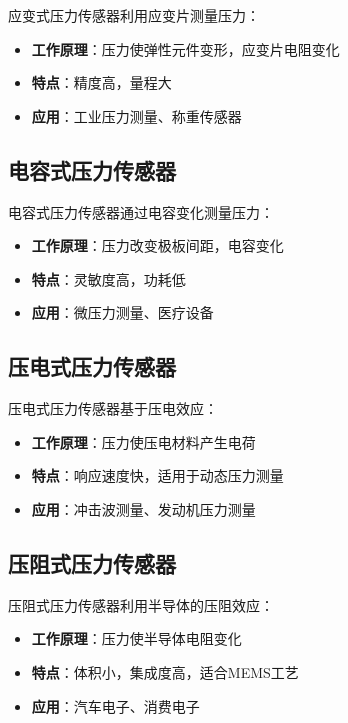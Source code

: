 \documentclass[12pt,UTF8]{ctexbook}
\begin{document}
应变式压力传感器利用应变片测量压力：

\begin{itemize}[leftmargin=2cm]
	\item \textbf{工作原理}：压力使弹性元件变形，应变片电阻变化
	\item \textbf{特点}：精度高，量程大
	\item \textbf{应用}：工业压力测量、称重传感器
\end{itemize}

\subsection{电容式压力传感器}

电容式压力传感器通过电容变化测量压力：

\begin{itemize}[leftmargin=2cm]
	\item \textbf{工作原理}：压力改变极板间距，电容变化
	\item \textbf{特点}：灵敏度高，功耗低
	\item \textbf{应用}：微压力测量、医疗设备
\end{itemize}

\subsection{压电式压力传感器}

压电式压力传感器基于压电效应：

\begin{itemize}[leftmargin=2cm]
	\item \textbf{工作原理}：压力使压电材料产生电荷
	\item \textbf{特点}：响应速度快，适用于动态压力测量
	\item \textbf{应用}：冲击波测量、发动机压力测量
\end{itemize}

\subsection{压阻式压力传感器}

压阻式压力传感器利用半导体的压阻效应：

\begin{itemize}[leftmargin=2cm]
	\item \textbf{工作原理}：压力使半导体电阻变化
	\item \textbf{特点}：体积小，集成度高，适合MEMS工艺
	\item \textbf{应用}：汽车电子、消费电子
\end{itemize}
\end{document}
